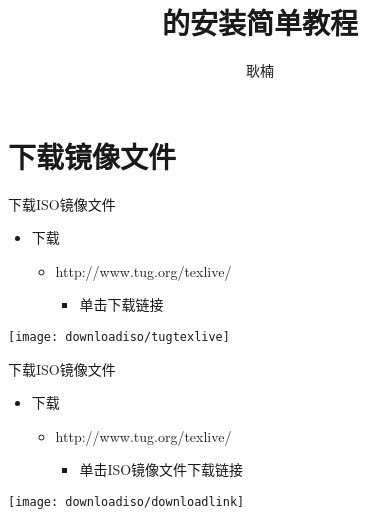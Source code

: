 \documentclass[fontset = none, t]{ctexbeamer}
\title[\TeXLive 的安装]{\TeXLive 的安装简单教程}
\author[N. Geng]{耿楠}
\institute[教发中心]{西北农林科技大学教学发展中心}
\date{\tosemester}
\begin{document}
\maketitle

\section[下载\TeXLive]{下载\TeXLive 镜像文件}
\begin{frame}{下载\TeXLive}{ISO镜像文件}
  \begin{itemize}
  \item 下载
    \begin{itemize}
    \item http://www.tug.org/texlive/
      \begin{itemize}
      \item 单击\alert{\tl}下载链接
      \end{itemize}
    \end{itemize}
  \end{itemize}  
  \centering
  \begin{annotatedFigure}
    {\texttt{[image: downloadiso/tugtexlive]}}
  \end{annotatedFigure}
\end{frame}

\begin{frame}{下载\TeXLive}{ISO镜像文件}
  \begin{itemize}
  \item 下载
    \begin{itemize}
    \item http://www.tug.org/texlive/
      \begin{itemize}
      \item 单击\alert{ISO镜像文件}下载链接
      \end{itemize}
    \end{itemize}
  \end{itemize}  
  \centering
  \begin{annotatedFigure}
    {\texttt{[image: downloadiso/downloadlink]}}
  \end{annotatedFigure}
\end{frame}
\end{document}
